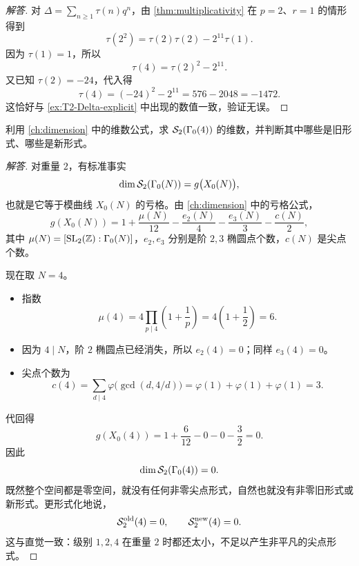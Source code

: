 \begin{proof}[解答]
对 $\Delta=\sum_{n\ge1}\tau(n)q^n$，由 \cref{thm:multiplicativity} 在 $p=2$、$r=1$ 的情形得到
\[
  \tau(2^2)=\tau(2)\tau(2)-2^{11}\tau(1).
\]
因为 $\tau(1)=1$，所以
\[
  \tau(4)=\tau(2)^2-2^{11}.
\]
又已知 $\tau(2)=-24$，代入得
\[
  \tau(4)=(-24)^2-2^{11}=576-2048=-1472.
\]
这恰好与 \cref{ex:T2-Delta-explicit} 中出现的数值一致，验证无误。
\end{proof}

\begin{exercise}
\label{ex:gamma0-4-newforms}
利用 \cref{ch:dimension} 中的维数公式，求 $\mathcal{S}_2(\Gamma_0(4))$ 的维数，并判断其中哪些是旧形式、哪些是新形式。
\end{exercise}

\begin{proof}[解答]
对重量 $2$，有标准事实
\[
  \dim \mathcal{S}_2(\Gamma_0(N))=g\bigl(X_0(N)\bigr),
\]
也就是它等于模曲线 $X_0(N)$ 的亏格。由 \cref{ch:dimension} 中的亏格公式，
\[
  g(X_0(N))=1+\frac{\mu(N)}{12}-\frac{e_2(N)}{4}-\frac{e_3(N)}{3}-\frac{c(N)}{2},
\]
其中 $\mu(N)=[\mathrm{SL}_2(\mathbb{Z}):\Gamma_0(N)]$，$e_2,e_3$ 分别是阶 $2,3$ 椭圆点个数，$c(N)$ 是尖点个数。

现在取 $N=4$。
\begin{itemize}
  \item 指数
        \[
          \mu(4)=4\prod_{p\mid 4}\left(1+\frac1p\right)=4\left(1+\frac12\right)=6.
        \]
  \item 因为 $4\mid N$，阶 $2$ 椭圆点已经消失，所以 $e_2(4)=0$；同样 $e_3(4)=0$。
  \item 尖点个数为
        \[
          c(4)=\sum_{d\mid 4}\varphi\bigl(\gcd(d,4/d)\bigr)
          =\varphi(1)+\varphi(1)+\varphi(1)=3.
        \]
\end{itemize}
代回得
\[
  g(X_0(4))=1+\frac{6}{12}-0-0-\frac{3}{2}=0.
\]
因此
\[
  \dim \mathcal{S}_2(\Gamma_0(4))=0.
\]
既然整个空间都是零空间，就没有任何非零尖点形式，自然也就没有非零旧形式或新形式。更形式化地说，
\[
  \mathcal{S}_2^{\mathrm{old}}(4)=0,
  \qquad
  \mathcal{S}_2^{\mathrm{new}}(4)=0.
\]
这与直觉一致：级别 $1,2,4$ 在重量 $2$ 时都还太小，不足以产生非平凡的尖点形式。
\end{proof}


